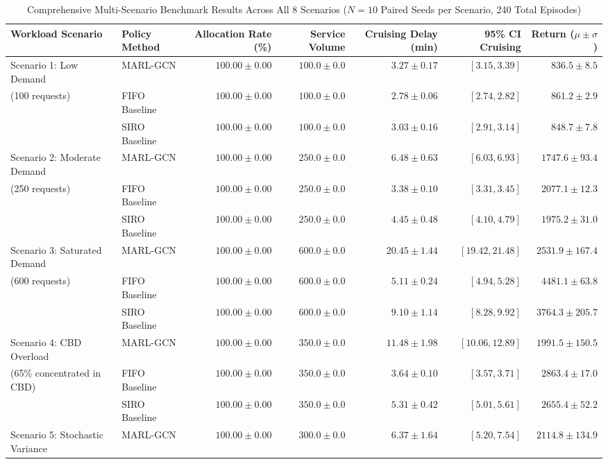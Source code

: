 \documentclass[journal]{IEEEtran}
\begin{document}
\begin{table}[t]
\caption{Comprehensive Multi-Scenario Benchmark Results Across All 8 Scenarios ($N=10$ Paired Seeds per Scenario, 240 Total Episodes)}
\label{tab:benchmarks_summary}
\centering
\begin{tabular}{llrrrrr}
\toprule
\textbf{Workload Scenario} & \textbf{Policy Method} & \textbf{Allocation Rate (\%)} & \textbf{Service Volume} & \textbf{Cruising Delay (min)} & \textbf{95\% CI Cruising} & \textbf{Return ($\mu \pm \sigma$)} \\
\midrule
Scenario 1: Low Demand & MARL-GCN & $100.00 \pm 0.00$ & $100.0 \pm 0.0$ & $3.27 \pm 0.17$ & $[3.15, 3.39]$ & $836.5 \pm 8.5$ \\
(100 requests) & FIFO Baseline & $100.00 \pm 0.00$ & $100.0 \pm 0.0$ & $2.78 \pm 0.06$ & $[2.74, 2.82]$ & $861.2 \pm 2.9$ \\
& SIRO Baseline & $100.00 \pm 0.00$ & $100.0 \pm 0.0$ & $3.03 \pm 0.16$ & $[2.91, 3.14]$ & $848.7 \pm 7.8$ \\
\midrule
Scenario 2: Moderate Demand & MARL-GCN & $100.00 \pm 0.00$ & $250.0 \pm 0.0$ & $6.48 \pm 0.63$ & $[6.03, 6.93]$ & $1747.6 \pm 93.4$ \\
(250 requests) & FIFO Baseline & $100.00 \pm 0.00$ & $250.0 \pm 0.0$ & $3.38 \pm 0.10$ & $[3.31, 3.45]$ & $2077.1 \pm 12.3$ \\
& SIRO Baseline & $100.00 \pm 0.00$ & $250.0 \pm 0.0$ & $4.45 \pm 0.48$ & $[4.10, 4.79]$ & $1975.2 \pm 31.0$ \\
\midrule
Scenario 3: Saturated Demand & MARL-GCN & $100.00 \pm 0.00$ & $600.0 \pm 0.0$ & $20.45 \pm 1.44$ & $[19.42, 21.48]$ & $2531.9 \pm 167.4$ \\
(600 requests) & FIFO Baseline & $100.00 \pm 0.00$ & $600.0 \pm 0.0$ & $5.11 \pm 0.24$ & $[4.94, 5.28]$ & $4481.1 \pm 63.8$ \\
& SIRO Baseline & $100.00 \pm 0.00$ & $600.0 \pm 0.0$ & $9.10 \pm 1.14$ & $[8.28, 9.92]$ & $3764.3 \pm 205.7$ \\
\midrule
Scenario 4: CBD Overload & MARL-GCN & $100.00 \pm 0.00$ & $350.0 \pm 0.0$ & $11.48 \pm 1.98$ & $[10.06, 12.89]$ & $1991.5 \pm 150.5$ \\
(65\% concentrated in CBD) & FIFO Baseline & $100.00 \pm 0.00$ & $350.0 \pm 0.0$ & $3.64 \pm 0.10$ & $[3.57, 3.71]$ & $2863.4 \pm 17.0$ \\
& SIRO Baseline & $100.00 \pm 0.00$ & $350.0 \pm 0.0$ & $5.31 \pm 0.42$ & $[5.01, 5.61]$ & $2655.4 \pm 52.2$ \\
\midrule
Scenario 5: Stochastic Variance & MARL-GCN & $100.00 \pm 0.00$ & $300.0 \pm 0.0$ & $6.37 \pm 1.64$ & $[5.20, 7.54]$ & $2114.8 \pm 134.9$ \\

\end{tabular}
\end{table}
\end{document}
